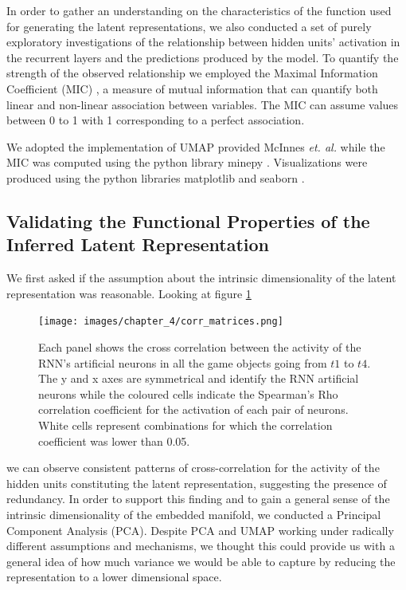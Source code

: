 In order to gather an understanding on the characteristics of the function used for generating the latent representations, we also conducted a set of purely exploratory investigations of the relationship between hidden units' activation in the recurrent layers and the predictions produced by the model. To quantify the strength of the observed relationship we employed the Maximal Information Coefficient (MIC) \cite{reshef2011detecting}, a measure of mutual information that can quantify both linear and non-linear association between variables. The MIC can assume values between 0 to 1 with 1 corresponding to a perfect association. 

We adopted the implementation of UMAP provided McInnes \textit{et. al.} \cite{mcinnes2018umap-software} while the MIC was computed using the python library minepy \cite{albanese2013minerva}. Visualizations were produced using the python libraries matplotlib \cite{hunter2007matplotlib} and seaborn \cite{waskom2021seaborn}.

\subsection{Validating the Functional Properties of the Inferred Latent Representation}
\label{functional_properties}
We first asked if the assumption about the intrinsic dimensionality of the latent representation was reasonable. Looking at figure \ref{cross_corr_act}

\begin{figure}[!htb]
\centering
\texttt{[image: images/chapter\_4/corr\_matrices.png]}
\caption[\textbf{Cross-correlation analysis of the hidden units activation of the RNN architecture}]{Each panel shows the cross correlation between the activity of the RNN's artificial neurons in all the game objects going from $t1$ to $t4$. The y and x axes are symmetrical and identify the RNN artificial neurons while the coloured cells indicate the Spearman's Rho correlation coefficient for the activation of each pair of neurons. White cells represent combinations for which the correlation coefficient was lower than 0.05.}
\label{cross_corr_act} 
\end{figure}

we can observe consistent patterns of cross-correlation for the activity of the hidden units constituting the latent representation, suggesting the presence of redundancy. In order to support this finding and to gain a general sense of the intrinsic dimensionality of the embedded manifold, we conducted a Principal Component Analysis (PCA). Despite PCA and UMAP working under radically different assumptions and mechanisms, we thought this could provide us with a general idea of how much variance we would be able to capture by reducing the representation to a lower dimensional space. 

